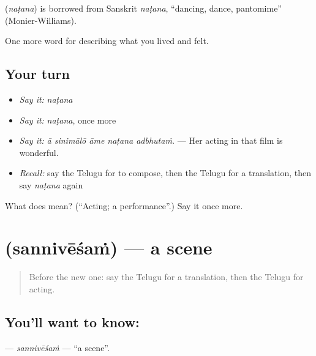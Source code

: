 \begin{cousinweb}
\textbf{} (\emph{naṭana}) is borrowed from Sanskrit \emph{naṭana}, \textquotedblleft{}dancing, dance, pantomime\textquotedblright{} (Monier-Williams).
\end{cousinweb}

\begin{grammarlens}[title={What you've built}]
One more word for describing what you lived and felt.
\end{grammarlens}

\subsection*{Your turn}
\begin{itemize}
\raggedright
  \item \emph{Say it:} \emph{naṭana}
  \item \emph{Say it:} \emph{naṭana}, once more
  \item \emph{Say it:} \emph{ā sinimālō āme naṭana adbhutaṁ.} — Her acting in that film is wonderful.
  \item \emph{Recall:} say the Telugu for to compose, then the Telugu for a translation, then say \emph{naṭana} again
\end{itemize}

\begin{tcolorbox}[breakable,colback=teal!4,colframe=teal!35!black,title={Before you move on}]
What does  mean? (\textquotedblleft{}Acting; a performance\textquotedblright{}.) Say it once more.
\end{tcolorbox}
\section[\texorpdfstring{\te{సన్నివేశం} (sannivēśaṁ)}{సన్నివేశం (sannivēśaṁ)}]{ (sannivēśaṁ) — a scene}

\label{lesson:TE-C541-sannivesam}



\begin{quote}
Before the new one: say the Telugu for a translation, then the Telugu for acting.
\end{quote}

\subsection*{You'll want to know: }
\textbf{} — \emph{sannivēśaṁ} — \textquotedblleft{}a scene\textquotedblright{}.

